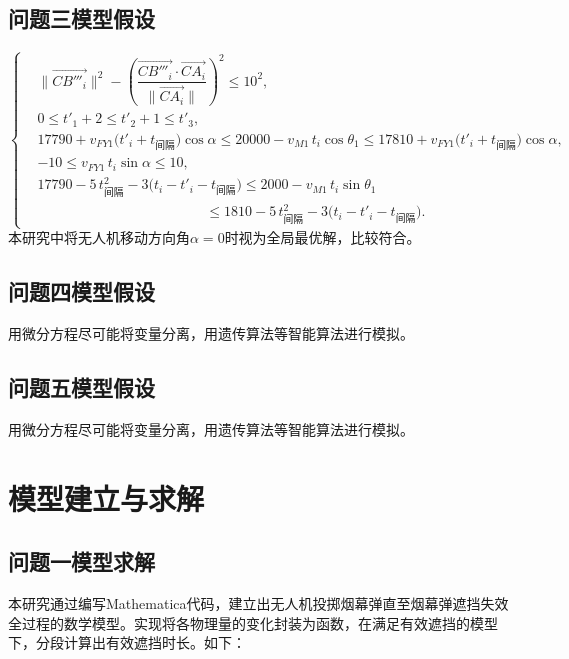 \documentclass{article}
\begin{document}
\subsection{问题三模型假设}
\begin{equation*}
\left\{
\begin{aligned}
&\bigl\|\overrightarrow{CB'''_i}\bigr\|^{2}
- \left(\dfrac{\overrightarrow{CB'''_i}\cdot\overrightarrow{CA_i}}{\|\overrightarrow{CA_i}\|}\right)^{2}
\le 10^{2},\\[6pt]
&0 \le t'_1 + 2 \le t'_2 + 1 \le t'_3,\\[6pt]
&17790 + v_{FY1}\bigl(t'_i + t_{\text{间隔}}\bigr)\cos\alpha
\le 20000 - v_{M1}\,t_i\cos\theta_1
\le 17810 + v_{FY1}\bigl(t'_i + t_{\text{间隔}}\bigr)\cos\alpha,\\[6pt]
&-10 \le v_{FY1}\,t_i\sin\alpha \le 10,\\[6pt]
&17790-5\,t_{\text{间隔}}^{2}-3\bigl(t_i - t'_i - t_{\text{间隔}}\bigr)
\le 2000 - v_{M1}\,t_i\sin\theta_1 \\
&\qquad\qquad\qquad\qquad\qquad\qquad
\le 1810-5\,t_{\text{间隔}}^{2}-3\bigl(t_i - t'_i - t_{\text{间隔}}\bigr).
\end{aligned}
\right.
\end{equation*}
本研究中将$无人机移动方向角\alpha = 0$时视为全局最优解，比较符合。

\subsection{问题四模型假设}
用微分方程尽可能将变量分离，用遗传算法等智能算法进行模拟。

\subsection{问题五模型假设}
用微分方程尽可能将变量分离，用遗传算法等智能算法进行模拟。

\section{模型建立与求解}

\subsection{问题一模型求解}

本研究通过编写Mathematica代码，建立出无人机投掷烟幕弹直至烟幕弹遮挡失效全过程的数学模型。实现将各物理量的变化封装为函数，在满足有效遮挡的模型下，分段计算出有效遮挡时长。如下：
\end{document}
